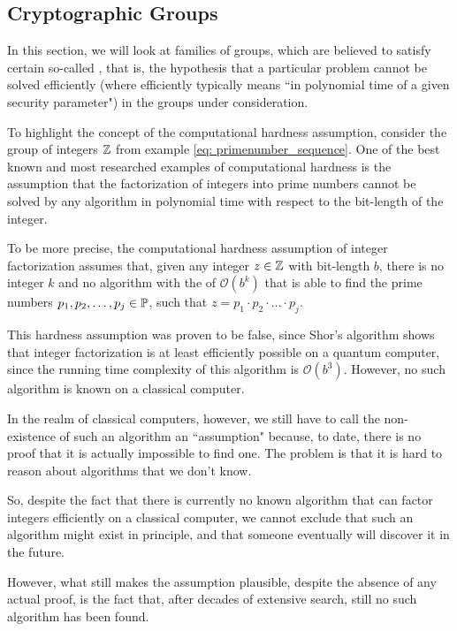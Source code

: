 
\subsection{Cryptographic Groups} In this section, we will look at families of groups, which are believed to satisfy certain so-called , that is, the hypothesis that a particular problem cannot be solved efficiently (where efficiently typically means ``in polynomial time of a given security parameter") in the groups under consideration. 
\begin{example} 
To highlight the concept of the computational hardness assumption, consider the group of integers $\mathbb{Z}$ from example \ref{eq: primenumber_sequence}. One of the best known and most researched examples of computational hardness is the assumption that the factorization of integers into prime numbers cannot be solved by any algorithm in polynomial time with respect to the bit-length of the integer.

To be more precise, the computational hardness assumption of integer factorization assumes that, given any integer $z\in\mathbb{Z}$ with bit-length $b$, there is no integer $k$ and no algorithm with the  of $\mathcal{O}(b^k)$ that is able to find the prime numbers $p_1, p_2,\ldots,p_j\in\mathbb{P}$, such that $z=p_1\cdot p_2\cdot \ldots\cdot p_j$. 

This hardness assumption was proven to be false, since Shor's algorithm shows that integer factorization is at least efficiently possible on a quantum computer, since the running time complexity of this algorithm is $\mathcal{O}(b^3)$. However, no such algorithm is known on a classical computer.

In the realm of classical computers, however, we still have to call the non-existence of such an algorithm an ``assumption" because, to date, there is no proof that it is actually impossible to find one. The problem is that it is hard to reason about algorithms that we don't know.

So, despite the fact that there is currently no known algorithm that can factor integers efficiently on a classical computer, we cannot exclude that such an algorithm might exist in principle, and that someone eventually will discover it in the future.

However, what still makes the assumption plausible, despite the absence of any actual proof, is the fact that, after decades of extensive search, still no such algorithm has been found.
\end{example}
